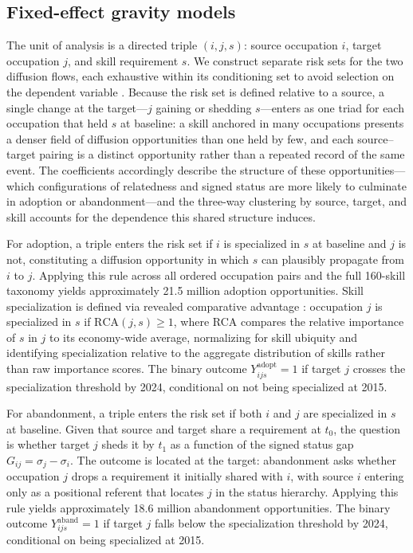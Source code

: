 \documentclass[11pt, letterpaper]{article} %
\newcommand{\parencite}[1]{\cite{#1}}
\begin{document}
\subsection*{Fixed-effect gravity models}
 
The unit of analysis is a directed triple $(i, j, s)$: source occupation $i$, target occupation $j$, and skill requirement $s$. We construct separate risk sets for the two diffusion flows, each exhaustive within its conditioning set to avoid selection on the dependent variable \parencite{bail_prestige_2019}. Because the risk set is defined relative to a source, a single change at the target---$j$ gaining or shedding $s$---enters as one triad for each occupation that held $s$ at baseline: a skill anchored in many occupations presents a denser field of diffusion opportunities than one held by few, and each source--target pairing is a distinct opportunity rather than a repeated record of the same event. The coefficients accordingly describe the structure of these opportunities---which configurations of relatedness and signed status are more likely to culminate in adoption or abandonment---and the three-way clustering by source, target, and skill accounts for the dependence this shared structure induces.
 
For adoption, a triple enters the risk set if $i$ is specialized in $s$ at baseline and $j$ is not, constituting a diffusion opportunity in which $s$ can plausibly propagate from $i$ to $j$. Applying this rule across all ordered occupation pairs and the full 160-skill taxonomy yields approximately 21.5 million adoption opportunities. Skill specialization is defined via revealed comparative advantage \parencite{alabdulkareem_unpacking_2018}: occupation $j$ is specialized in $s$ if $\mathrm{RCA}(j,s) \geq 1$, where RCA compares the relative importance of $s$ in $j$ to its economy-wide average, normalizing for skill ubiquity and identifying specialization relative to the aggregate distribution of skills rather than raw importance scores. The binary outcome $Y^{\mathrm{adopt}}_{ijs} = 1$ if target $j$ crosses the specialization threshold by 2024, conditional on not being specialized at 2015.
 
For abandonment, a triple enters the risk set if both $i$ and $j$ are specialized in $s$ at baseline. Given that source and target share a requirement at $t_0$, the question is whether target $j$ sheds it by $t_1$ as a function of the signed status gap $G_{ij} = \sigma_j - \sigma_i$. The outcome is located at the target: abandonment asks whether occupation $j$ drops a requirement it initially shared with $i$, with source $i$ entering only as a positional referent that locates $j$ in the status hierarchy. Applying this rule yields approximately 18.6 million abandonment opportunities. The binary outcome $Y^{\mathrm{aband}}_{ijs} = 1$ if target $j$ falls below the specialization threshold by 2024, conditional on being specialized at 2015.
 
\end{document}
